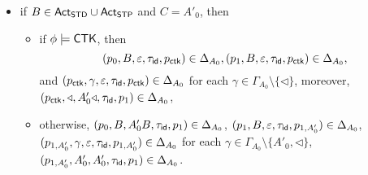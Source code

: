 \begin{itemize}
\begin{itemize}
\begin{itemize}
				\item if $B \in {\sf Act}_{\sf STD} \cup {\sf Act}_{\sf STP}$ and $C = A'_0$,  then 
				\begin{itemize}
					\item if $\phi \models \mathsf{CTK}$, then 
					$$(p_0, B, \varepsilon, \tau_{\mathsf{id}}, p_{\sf ctk}) \in \Delta_{A_0}, (p_1, B, \varepsilon, \tau_{\mathsf{id}}, p_{\sf ctk}) \in \Delta_{A_0},$$ 
					and $(p_{\sf ctk}, \gamma, \varepsilon, \tau_{\mathsf{id}}, p_{\sf ctk}) \in \Delta_{A_0}$ 
					for each $\gamma \in \Gamma_{A_0} \setminus \{\triangleleft\}$, moreover, $(p_{\sf ctk}, \triangleleft, A'_0 \triangleleft, \tau_{\mathsf{id}}, p_1) \in \Delta_{A_0}$, 
					\item otherwise, $(p_0, B, A'_0 B, \tau_{\mathsf{id}}, p_1) \in \Delta_{A_0}$, $(p_1, B, \varepsilon, \tau_{\mathsf{id}}, p_{1, A'_0}) \in \Delta_{A_0}$, $(p_{1, A'_0}, \gamma, \varepsilon, \tau_{\mathsf{id}}, p_{1, A'_0}) \in \Delta_{A_0}$ for each $\gamma \in \Gamma_{A_0} \setminus \{A'_0, \triangleleft\}$,  $(p_{1, A'_0}, A'_0, A'_0, \tau_{\mathsf{id}}, p_1) \in \Delta_{A_0}$.  
				\end{itemize}				
            \end{itemize}
        \end{itemize}
\end{itemize}

